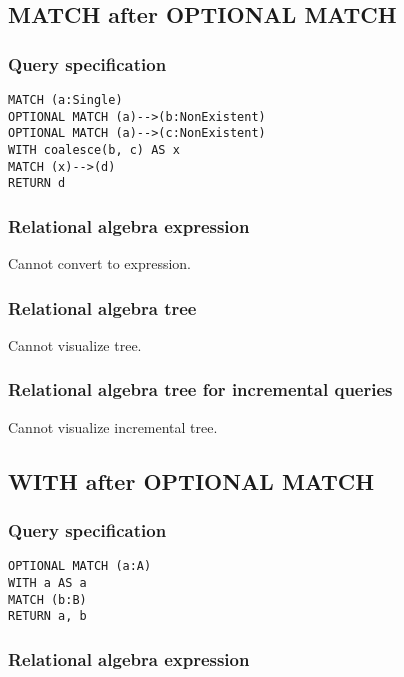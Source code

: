 \subsection{MATCH after OPTIONAL MATCH}

\subsubsection*{Query specification}

\begin{lstlisting}
MATCH (a:Single)
OPTIONAL MATCH (a)-->(b:NonExistent)
OPTIONAL MATCH (a)-->(c:NonExistent)
WITH coalesce(b, c) AS x
MATCH (x)-->(d)
RETURN d
\end{lstlisting}

\subsubsection*{Relational algebra expression}

Cannot convert to expression.

\subsubsection*{Relational algebra tree}

Cannot visualize tree.

\subsubsection*{Relational algebra tree for incremental queries}

Cannot visualize incremental tree.

\subsection{WITH after OPTIONAL MATCH}

\subsubsection*{Query specification}

\begin{lstlisting}
OPTIONAL MATCH (a:A)
WITH a AS a
MATCH (b:B)
RETURN a, b
\end{lstlisting}

\subsubsection*{Relational algebra expression}

